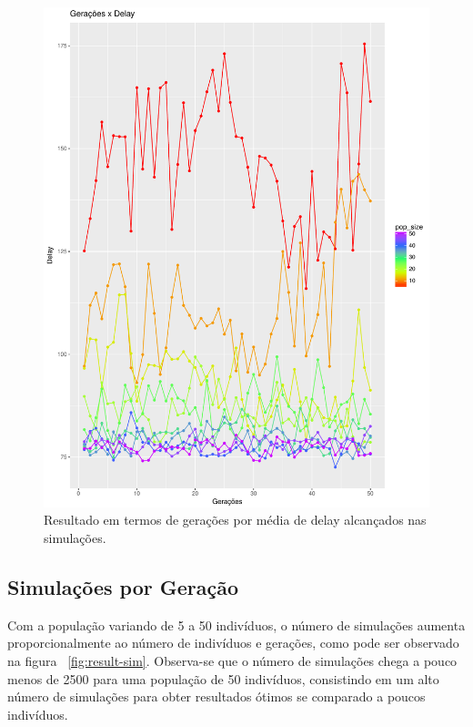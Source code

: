 \documentclass[conference]{IEEEtran}
\begin{document}
\begin{figure}[h]
  \centering
  \includegraphics[scale=0.30]{figures/GeracoesXDelay.pdf}
  \caption{Resultado em termos de gerações por média de delay alcançados nas simulações.}
  \label{fig:result-delay}
\end{figure}


\subsection{Simulações por Geração}

Com a população variando de 5 a 50 indivíduos, o número de simulações
aumenta proporcionalmente ao número de indivíduos e gerações, como
pode ser observado na figura ~\ref{fig:result-sim}.
Observa-se que o número de simulações chega a pouco menos de 2500 para uma população de
50 indivíduos, consistindo em um alto número de simulações para obter
resultados ótimos se comparado a poucos indivíduos.
\end{document}
